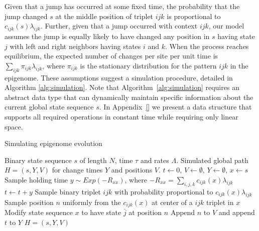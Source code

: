 \documentclass[11pt]{article}
\begin{document}
Given that a jump has occurred at some fixed time, the probability
that the jump changed $s$ at the middle position of triplet $ijk$ is
proportional to $c_{ijk}(s)\lambda_{ijk}$. Further, given that a jump
occurred with context $ijk$, our model assumes the jump is equally
likely to have changed any position in $s$ having state $j$ with left
and right neighbors having states $i$ and $k$.
When the process reaches equilibrium, the expected number of changes
per site per unit time is
$\sum_{ijk}\pi_{ijk}\lambda_{ijk}$, where $\pi_{ijk}$ is the
stationary distribution for the pattern $ijk$ in the epigenome.
These assumptions suggest a simulation procedure, detailed in
Algorithm \ref{alg:simulation}. Note that
Algorithm~\ref{alg:simulation} requires an abstract data type that can
dynamically maintain specific information about the current global
state sequence $s$. In Appendix~\ref{} we present a data structure
that supports all required operations in constant time while requiring
only linear space.

\begin{algorithm}[t]
  \begin{algorithmic}[1]
    \caption{Simulating epigenome evolution}\label{alg:simulation}
    \REQUIRE Binary state sequence $s$ of length $N$, time $\tau$ and rates $\Lambda$.
    \ENSURE Simulated global path $H = (s, Y, V)$ for change times $Y$ and positions $V$.
    \STATE $t \gets 0$, $V\gets\emptyset$, $Y\gets\emptyset$, $x \gets s$
    \STATE Sample holding time $y\sim \mathit{Exp}(-R_{xx})$,
           where $-R_{xx} = \sum_{i,j,k}c_{ijk}(x)\lambda_{ijk}$
    \STATE $t \gets t + y$
    \STATE Sample binary triplet $ijk$ with probability proportional to $c_{ijk}(x)\lambda_{ijk}$
    \STATE Sample position $n$ uniformly from the $c_{ijk}(x)$ at center of a $ijk$ triplet in $x$
    \STATE Modify state sequence $x$ to have state $\bar{j}$ at position $n$
    \STATE Append $n$ to $V$ and append $t$ to $Y$
    \ENDIF
    \ENDWHILE
    \RETURN $H = (s, Y, V)$
  \end{algorithmic}
\end{algorithm}


\end{document}
